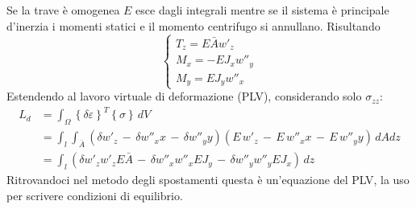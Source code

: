 Se la trave è omogenea $E$ esce dagli integrali mentre se il sistema è principale d'inerzia i momenti statici e il momento centrifugo si annullano. Risultando
\begin{equation*}
    \begin{cases}
        T_z = E\bar{A} w'_z\\
        M_x = -EJ_xw''_y\\
        M_y = EJ_yw''_x
    \end{cases}
\end{equation*}
Estendendo al lavoro virtuale di deformazione (PLV), considerando solo $\sigma_{zz}$:
\begin{align*}
     L_d &= \int_\Omega  \left\{\delta \varepsilon\right\}^T \left\{\sigma\right\}\, dV\\
     &= \int_l\int_{\bar{A}} ( \delta w'_z \,-\,\delta w''_x  x\, -\,\delta w''_y  y)   (E\,w'_z \,-\,E\,w''_x  x\, -\,E\,w''_y  y)\,dAdz\\
     &= \int_l(\delta w'_z w'_z E\bar{A}\,-\,\delta w''_xw''_x EJ_y  \, -\,\delta w''_yw''_yEJ_x  )\,dz
\end{align*}
Ritrovandoci nel metodo degli spostamenti questa è un'equazione del PLV, la uso per scrivere condizioni di equilibrio.



